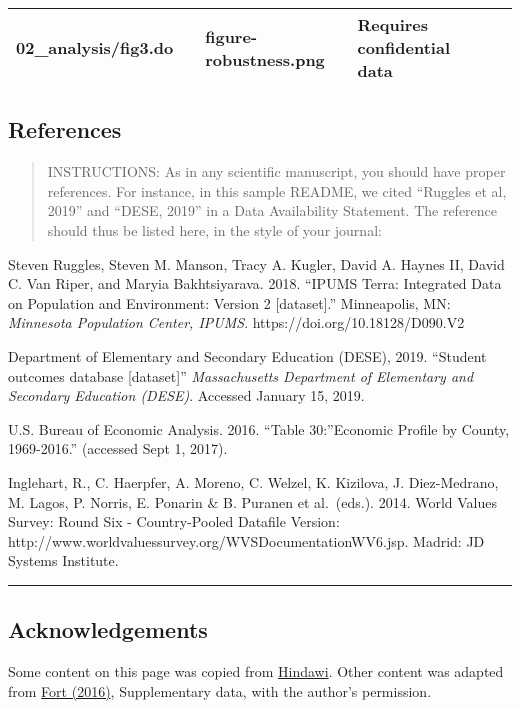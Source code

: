\documentclass[
]{article}
\begin{document}
\begin{longtable}[]{@{}lllll@{}}
\begin{minipage}[t]{0.18\columnwidth}
02\_analysis/fig3.do\strut
\end{minipage} & \begin{minipage}[t]{0.09\columnwidth}\raggedright
\strut
\end{minipage} & \begin{minipage}[t]{0.23\columnwidth}\raggedright
figure-robustness.png\strut
\end{minipage} & \begin{minipage}[t]{0.23\columnwidth}\raggedright
Requires confidential data\strut
\end{minipage}\tabularnewline
\bottomrule
\end{longtable}

\hypertarget{references}{%
\subsection{References}\label{references}}

\begin{quote}
INSTRUCTIONS: As in any scientific manuscript, you should have proper
references. For instance, in this sample README, we cited ``Ruggles et
al, 2019'' and ``DESE, 2019'' in a Data Availability Statement. The
reference should thus be listed here, in the style of your journal:
\end{quote}

Steven Ruggles, Steven M. Manson, Tracy A. Kugler, David A. Haynes II,
David C. Van Riper, and Maryia Bakhtsiyarava. 2018. ``IPUMS Terra:
Integrated Data on Population and Environment: Version 2
{[}dataset{]}.'' Minneapolis, MN: \emph{Minnesota Population Center,
IPUMS}. https://doi.org/10.18128/D090.V2

Department of Elementary and Secondary Education (DESE), 2019. ``Student
outcomes database {[}dataset{]}'' \emph{Massachusetts Department of
Elementary and Secondary Education (DESE)}. Accessed January 15, 2019.

U.S. Bureau of Economic Analysis. 2016. ``Table 30:''Economic Profile by
County, 1969-2016.'' (accessed Sept 1, 2017).

Inglehart, R., C. Haerpfer, A. Moreno, C. Welzel, K. Kizilova, J.
Diez-Medrano, M. Lagos, P. Norris, E. Ponarin \& B. Puranen et
al.~(eds.). 2014. World Values Survey: Round Six - Country-Pooled
Datafile Version:
http://www.worldvaluessurvey.org/WVSDocumentationWV6.jsp. Madrid: JD
Systems Institute.

\begin{center}\rule{0.5\linewidth}{0.5pt}\end{center}

\hypertarget{acknowledgements}{%
\subsection{Acknowledgements}\label{acknowledgements}}

Some content on this page was copied from
\href{https://www.hindawi.com/research.data/\#statement.templates}{Hindawi}.
Other content was adapted from
\href{https://doi.org/10.1093/restud/rdw057}{Fort (2016)}, Supplementary
data, with the author's permission.
\end{document}
